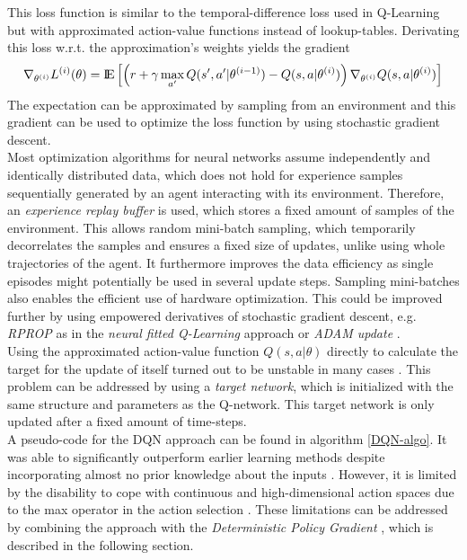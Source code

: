 This loss function is similar to the temporal-difference loss used in Q-Learning but with approximated action-value functions instead of lookup-tables. Derivating this loss w.r.t. the approximation's weights yields the gradient
\[
\nabla_{\theta^{(i)}}L^{(i)}(\theta)={\rm I\!E} \left[\left(r+\gamma \max_{a'} Q(s', 
a'|\theta^{(i-1)})-Q(s,a|\theta^{(i)})\right)\nabla_{\theta^{(i)}}Q(s,a|\theta^{(i)})\right] 
\]
The expectation can be approximated by sampling from an environment and this gradient can be used to optimize the loss function by using stochastic gradient descent.\\
Most optimization algorithms for neural networks assume independently and identically distributed data, which does not hold for experience samples sequentially generated by an agent interacting with its environment. Therefore, an \textit{experience replay buffer} is used, which stores a fixed amount of samples of the environment. This allows random mini-batch sampling, which temporarily decorrelates the samples and ensures a fixed size of updates, unlike using whole trajectories of the agent. It furthermore improves the data efficiency as single episodes might potentially be used in several update steps. Sampling mini-batches also enables the efficient use of hardware optimization. This could be improved further by using empowered derivatives of stochastic gradient descent, e.g. \textit{RPROP} as in the \textit{neural fitted Q-Learning} approach \citep{riedmiller2005neural} or \textit{ADAM update} \citep{kingma2014adam}.\\
Using the approximated action-value function $Q(s,a|\theta)$ directly to calculate the target for the update of itself turned out to be unstable in many cases \citep{mnih2015human}. This problem can be addressed by using a \textit{target network}, which is initialized with the same structure and parameters as the Q-network. This target network is only updated after a fixed amount of time-steps.\\
A pseudo-code for the DQN approach can be found in algorithm \ref{DQN-algo}. It was able to significantly outperform earlier learning methods despite incorporating almost no prior knowledge about the inputs \citep{mnih2013playing}. However, it is limited by the disability to cope with continuous and high-dimensional action spaces due to the max operator in the action selection \citep{lillicrap2015continuous}. These limitations can be addressed by combining the approach with the \textit{Deterministic Policy Gradient} \citep{silver2014deterministic}, which is described in the following section.

